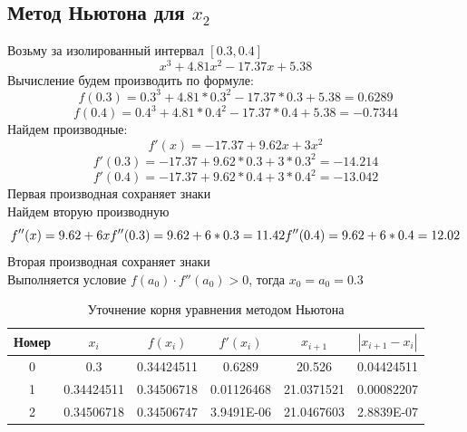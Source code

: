 \documentclass{article}
\begin{document}
      \subsection{Метод Ньютона для $x_2$}
                  Возьму за изолированный интервал $[0.3, 0.4]$
                  $$x^3+4.81x^2-17.37x+5.38$$
                  Вычисление будем производить по формуле:
                  \[
                  f(0.3)=0.3^3+4.81*0.3^2-17.37*0.3+5.38=0.6289
                  \]
                  \[
                  f(0.4)=0.4^3+4.81*0.4^2-17.37*0.4+5.38=-0.7344
                  \]
                  Найдем производные:
                  \[
                  f'(x)= -17.37 + 9.62 x + 3 x^2
                  \]
                  \[
                  f'(0.3)= -17.37 + 9.62 * 0.3 + 3 * 0.3^2 = -14.214
                  \]
                  \[
                  f'(0.4)= -17.37 + 9.62 * 0.4 + 3 * 0.4^2 = -13.042
                  \]
                  Первая производная сохраняет знаки \\
                  Найдем вторую производную
                  \[
                  f''(x)=9.62 + 6 x \\ 
                  f''(0.3)=9.62 + 6 * 0.3 = 11.42 \\
                  f''(0.4)=9.62 + 6 * 0.4 = 12.02    
                  \]
                  Вторая производная сохраняет знаки \\
                  Выполняется условие $f(a_0)\cdot f''(a_0)>0$, тогда $x_0 = a_0 = 0.3$
                  \begin{table}[H]
                        \centering
                              \begin{tabular}{|*{6}{c|}}
                              \hline
                              Номер & $x_i$ & $f(x_i)$ & $f'(x_i)$& $x_{i+1}$& $|x_{i+1}-x_i|$ \\ \hline
                              0 & 0.3        & 0.34424511 & 0.6289     & 20.526     & 0.04424511 \\ \hline
                              1 & 0.34424511 & 0.34506718 & 0.01126468 & 21.0371521 & 0.00082207 \\ \hline
                              2 & 0.34506718 & 0.34506747 & 3.9491E-06 & 21.0467603 & 2.8839E-07 \\ \hline
                              \end{tabular}
                  \caption{Уточнение корня уравнения методом Ньютона}
                  \end{table}
\end{document}
